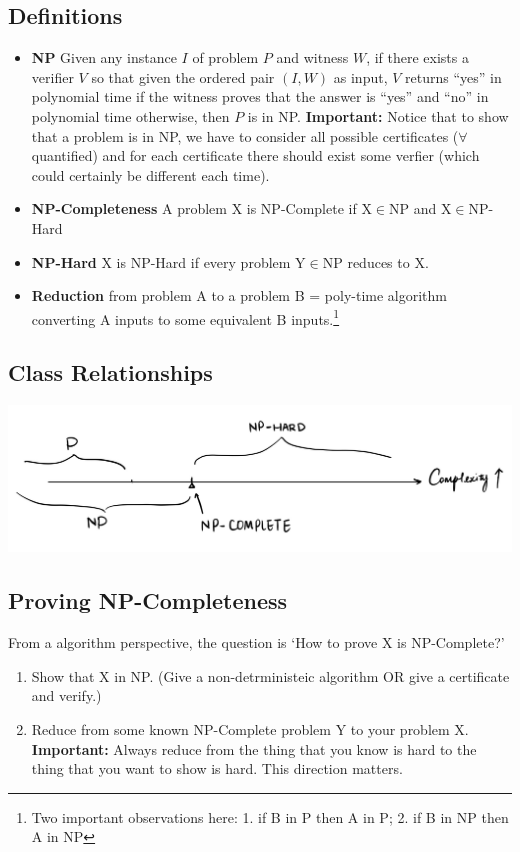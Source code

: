 \documentclass[10pt]{article}
\begin{document}
\subsection{Definitions}
\begin{itemize}
    \item \textbf{NP} Given any instance $I$ of problem $P$ and witness $W$, if there exists a verifier $V$ so that given the ordered pair $(I, W)$ as input, $V$ returns ``yes'' in polynomial time if the witness proves that the answer is ``yes'' and ``no'' in polynomial time otherwise, then $P$ is in NP. \textbf{Important:} Notice that to show that a problem is in NP, we have to consider all possible certificates ($\forall$ quantified) and for each certificate there should exist some verfier (which could certainly be different each time). 
    \item \textbf{NP-Completeness} A problem X is NP-Complete if X$\in$NP and X$\in $NP-Hard
    \item \textbf{NP-Hard} X is NP-Hard if every problem Y$\in$NP reduces to X.
    \item \textbf{Reduction} from problem A to a problem B = poly-time algorithm converting A inputs to some equivalent B inputs.\footnote{Two important observations here: 1. if B in P then A in P; 2. if B in NP then A in NP}
\end{itemize}

\subsection{Class Relationships}
\begin{center}
    \includegraphics[scale=0.16]{img/compare_complexities.jpg}
\end{center}

\subsection{Proving NP-Completeness}
From a algorithm perspective, the question is `How to prove X is NP-Complete?'
\begin{enumerate}
    \item Show that X in NP. (Give a non-detrministeic algorithm OR give a certificate and verify.)
    \item Reduce from some known NP-Complete problem Y to your problem X. \textbf{Important:} Always reduce from the thing that you know is hard to the thing that you want to show is hard. This direction matters. 
\end{enumerate}
\end{document}
